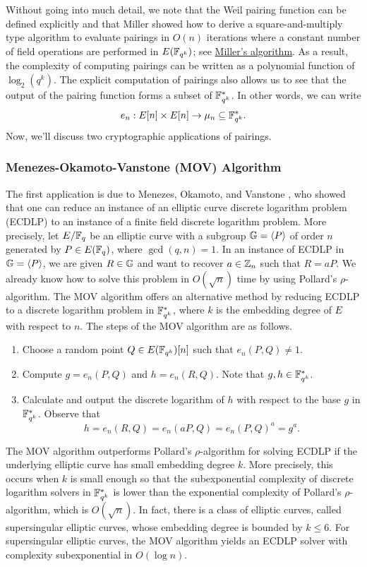 Without going into much detail, we note that the Weil pairing function can be 
defined explicitly and that Miller showed how to derive a square-and-multiply 
type algorithm to evaluate pairings in $O(n)$ iterations where a constant 
number of field operations are performed in $E(\mathbb{F}_{q^k})$; see 
\href{https://crypto.stanford.edu/miller/miller.pdf}{Miller's algorithm}.
As a result, the complexity of computing pairings can be written as a polynomial
function of $\log_2(q^k)$. The explicit computation of pairings also allows us to 
see that the output of the pairing function forms a subset of $\mathbb{F}_{q^k}^*$. 
In other words, we can write 
\[ e_n : E[n] \times E[n] \to \mu_n \subseteq \mathbb{F}_{q^k}^*. \] 
Now, we'll discuss two cryptographic applications of pairings. 

\subsubsection{Menezes-Okamoto-Vanstone (MOV) Algorithm}
The first application is due to Menezes, Okamoto, and Vanstone \cite{259647}, 
who showed that one can reduce an instance of an elliptic curve discrete 
logarithm problem (ECDLP) to an instance of a finite field discrete logarithm
problem. More precisely, let $E/\mathbb{F}_q$ be an elliptic curve with a subgroup 
$\mathbb{G} = \langle P \rangle$ of order $n$ generated by $P \in E(\mathbb{F}_q)$, where 
$\gcd(q, n) = 1$. In an instance of ECDLP in $\mathbb{G} = \langle P \rangle$,
we are given $R \in \mathbb{G}$ and want to recover $a \in \mathbb{Z}_n$ such that $R = aP$. 
We already know how to solve this problem in $O(\sqrt n)$ time by using 
Pollard's $\rho$-algorithm. The MOV algorithm offers an alternative method 
by reducing ECDLP to a discrete logarithm problem in $\mathbb{F}_{q^k}^*$, where 
$k$ is the embedding degree of $E$ with respect to $n$. The steps of 
the MOV algorithm are as follows. 
\begin{enumerate}
    \item Choose a random point $Q \in E(\mathbb{F}_{q^k})[n]$ such that $e_n(P, Q) \neq 1$. 
    \item Compute $g = e_n(P, Q)$ and $h = e_n(R, Q)$. Note that $g, h \in \mathbb{F}_{q^k}^*$. 
    \item Calculate and output the discrete logarithm of $h$ with respect to the base 
    $g$ in $\mathbb{F}_{q^k}^*$. Observe that 
    \[ h = e_n(R, Q) = e_n(aP, Q) = e_n(P, Q)^a = g^a. \] 
\end{enumerate}
The MOV algorithm outperforms Pollard's $\rho$-algorithm for solving ECDLP 
if the underlying elliptic curve has small embedding degree $k$. More precisely, 
this occurs when $k$ is small enough so that the subexponential complexity
of discrete logarithm solvers in $\mathbb{F}_{q^k}^*$ is lower than the exponential 
complexity of Pollard's $\rho$-algorithm, which is $O(\sqrt n)$. In fact, 
there is a class of elliptic curves, called supersingular elliptic curves, 
whose embedding degree is bounded by $k \leq 6$. For supersingular 
elliptic curves, the MOV algorithm yields an ECDLP solver with complexity 
subexponential in $O(\log n)$. 

